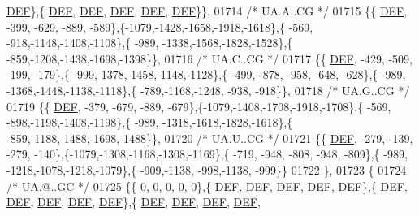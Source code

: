 \begin{DoxyCode}
      \mbox{\hyperlink{1_88_84__epars_8h_a397419fc12b37ed479c8abb9d444d843}{DEF}}\},\{  \mbox{\hyperlink{1_88_84__epars_8h_a397419fc12b37ed479c8abb9d444d843}{DEF}},  \mbox{\hyperlink{1_88_84__epars_8h_a397419fc12b37ed479c8abb9d444d843}{DEF}},  \mbox{\hyperlink{1_88_84__epars_8h_a397419fc12b37ed479c8abb9d444d843}{DEF}},  \mbox{\hyperlink{1_88_84__epars_8h_a397419fc12b37ed479c8abb9d444d843}{DEF}},  \mbox{\hyperlink{1_88_84__epars_8h_a397419fc12b37ed479c8abb9d444d843}{DEF}}\}\},
01714 \textcolor{comment}{/* UA.A..CG */}
01715 \{\{  \mbox{\hyperlink{1_88_84__epars_8h_a397419fc12b37ed479c8abb9d444d843}{DEF}}, -399, -629, -889, -589\},\{-1079,-1428,-1658,-1918,-1618\},\{ -569, -918,-1148,-1408,-1108\},\{ -989,
      -1338,-1568,-1828,-1528\},\{ -859,-1208,-1438,-1698,-1398\}\},
01716 \textcolor{comment}{/* UA.C..CG */}
01717 \{\{  \mbox{\hyperlink{1_88_84__epars_8h_a397419fc12b37ed479c8abb9d444d843}{DEF}}, -429, -509, -199, -179\},\{ -999,-1378,-1458,-1148,-1128\},\{ -499, -878, -958, -648, -628\},\{ -989,
      -1368,-1448,-1138,-1118\},\{ -789,-1168,-1248, -938, -918\}\},
01718 \textcolor{comment}{/* UA.G..CG */}
01719 \{\{  \mbox{\hyperlink{1_88_84__epars_8h_a397419fc12b37ed479c8abb9d444d843}{DEF}}, -379, -679, -889, -679\},\{-1079,-1408,-1708,-1918,-1708\},\{ -569, -898,-1198,-1408,-1198\},\{ -989,
      -1318,-1618,-1828,-1618\},\{ -859,-1188,-1488,-1698,-1488\}\},
01720 \textcolor{comment}{/* UA.U..CG */}
01721 \{\{  \mbox{\hyperlink{1_88_84__epars_8h_a397419fc12b37ed479c8abb9d444d843}{DEF}}, -279, -139, -279, -140\},\{-1079,-1308,-1168,-1308,-1169\},\{ -719, -948, -808, -948, -809\},\{ -989,
      -1218,-1078,-1218,-1079\},\{ -909,-1138, -998,-1138, -999\}\}
01722 \},
01723 \{
01724 \textcolor{comment}{/* UA.@..GC */}
01725 \{\{    0,    0,    0,    0,    0\},\{  \mbox{\hyperlink{1_88_84__epars_8h_a397419fc12b37ed479c8abb9d444d843}{DEF}},  \mbox{\hyperlink{1_88_84__epars_8h_a397419fc12b37ed479c8abb9d444d843}{DEF}},  \mbox{\hyperlink{1_88_84__epars_8h_a397419fc12b37ed479c8abb9d444d843}{DEF}},  \mbox{\hyperlink{1_88_84__epars_8h_a397419fc12b37ed479c8abb9d444d843}{DEF}},  \mbox{\hyperlink{1_88_84__epars_8h_a397419fc12b37ed479c8abb9d444d843}{DEF}}\},\{  
      \mbox{\hyperlink{1_88_84__epars_8h_a397419fc12b37ed479c8abb9d444d843}{DEF}},  \mbox{\hyperlink{1_88_84__epars_8h_a397419fc12b37ed479c8abb9d444d843}{DEF}},  \mbox{\hyperlink{1_88_84__epars_8h_a397419fc12b37ed479c8abb9d444d843}{DEF}},  \mbox{\hyperlink{1_88_84__epars_8h_a397419fc12b37ed479c8abb9d444d843}{DEF}},  \mbox{\hyperlink{1_88_84__epars_8h_a397419fc12b37ed479c8abb9d444d843}{DEF}}\},\{  \mbox{\hyperlink{1_88_84__epars_8h_a397419fc12b37ed479c8abb9d444d843}{DEF}},  \mbox{\hyperlink{1_88_84__epars_8h_a397419fc12b37ed479c8abb9d444d843}{DEF}},  \mbox{\hyperlink{1_88_84__epars_8h_a397419fc12b37ed479c8abb9d444d843}{DEF}},  \mbox{\hyperlink{1_88_84__epars_8h_a397419fc12b37ed479c8abb9d444d843}{DEF}},  

\end{DoxyCode}
